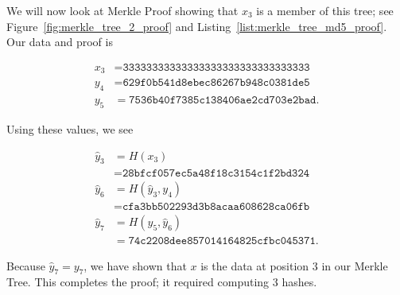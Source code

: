 \begin{example}

We will now look at Merkle Proof showing that $x_{3}$
is a member of this tree;
see Figure~\ref{fig:merkle_tree_2_proof}
and Listing~\ref{list:merkle_tree_md5_proof}.
Our data and proof is



\begin{align}
    x_{3} &= \texttt{33333333333333333333333333333333}
        \nonumber\\
    y_{4} &= \texttt{629f0b541d8ebec86267b948c0381de5}
        \nonumber\\
    y_{5} &= \texttt{7536b40f7385c138406ae2cd703e2bad}.
\end{align}

\noindent
Using these values, we see

\begin{align}
    \hat{y}_{3} &= H(x_{3}) \nonumber\\
        &= \texttt{28bfcf057ec5a48f18c3154c1f2bd324}
            \nonumber\\
    \hat{y}_{6} &= H(\hat{y}_{3}, y_{4}) \nonumber\\
        &= \texttt{cfa3bb502293d3b8acaa608628ca06fb}
            \nonumber\\
    \hat{y}_{7} &= H(y_{5}, \hat{y}_{6}) \nonumber\\
        &= \texttt{74c2208dee857014164825cfbc045371}.
\end{align}

\noindent
Because $\hat{y}_{7} = y_{7}$, we have shown that $x$ is the data
at position 3 in our Merkle Tree.
This completes the proof;
it required computing 3 hashes.
\end{example}

